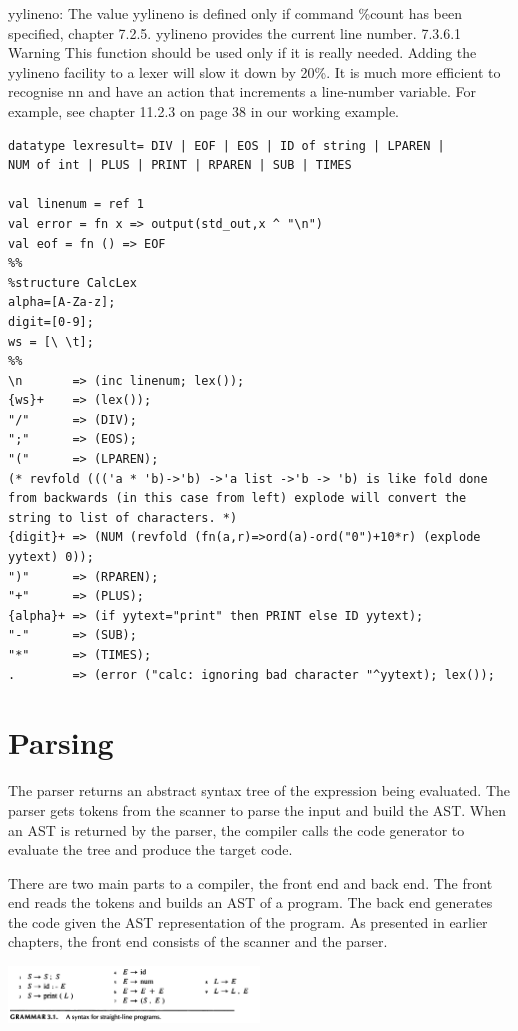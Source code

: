 \documentclass[8pt, a4paper, oneside, twocolumn]{extarticle}
\begin{document}
yylineno: 
The value yylineno is defined only if command \%count has been specified, chapter 7.2.5.
yylineno provides the current line number.
7.3.6.1 Warning This function should be used only if it is really needed. Adding
the yylineno facility to a lexer will slow it down by 20\%. It is much more efficient to
recognise nn and have an action that increments a line-number variable. For example,
see chapter 11.2.3 on page 38 in our working example.
\begin{verbatim}
datatype lexresult= DIV | EOF | EOS | ID of string | LPAREN |
NUM of int | PLUS | PRINT | RPAREN | SUB | TIMES 

val linenum = ref 1
val error = fn x => output(std_out,x ^ "\n")
val eof = fn () => EOF
%%
%structure CalcLex
alpha=[A-Za-z];
digit=[0-9];
ws = [\ \t];
%%
\n       => (inc linenum; lex());
{ws}+    => (lex());
"/"      => (DIV);
";"      => (EOS);
"("      => (LPAREN);
(* revfold ((('a * 'b)->'b) ->'a list ->'b -> 'b) is like fold done from backwards (in this case from left) explode will convert the string to list of characters. *)
{digit}+ => (NUM (revfold (fn(a,r)=>ord(a)-ord("0")+10*r) (explode yytext) 0));
")"      => (RPAREN);
"+"      => (PLUS);
{alpha}+ => (if yytext="print" then PRINT else ID yytext);
"-"      => (SUB);
"*"      => (TIMES);
.        => (error ("calc: ignoring bad character "^yytext); lex());
\end{verbatim}
\section{Parsing}
The parser returns an abstract syntax tree of the expression being evaluated. The parser gets tokens from the scanner to parse the input and build the AST. When an AST is
returned by the parser, the compiler calls the code generator to evaluate the tree and produce the target code.

There are two main parts to a compiler, the front end and back end. The front end
reads the tokens and builds an AST of a program. The back end generates the code
given the AST representation of the program. As presented in earlier chapters, the
front end consists of the scanner and the parser.

\includegraphics[width=0.5\textwidth,height=0.5\textheight,keepaspectratio]{slbg}
\end{document}
